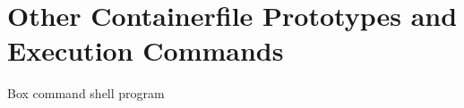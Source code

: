 \documentclass[journal,onecolumn]{IEEEtran}
\begin{document}
%


\appendices
\section{Other Containerfile Prototypes and Execution Commands}
Box command shell program
\end{document}
